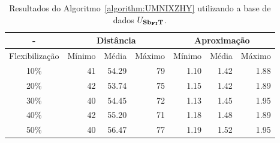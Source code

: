 \begin{table}[!htb]
  \caption{Resultados do Algoritmo~\ref{algorithm:UMNIXZHY} utilizando a base de dados $U_{\textbf{Sb\textsubscript{FI}T}}{}$.}
  \label{table:ZQDEMKFX}
  \centering
  \begin{tabular}{|c|r|r|r|r|r|r|}
    \hline
      -            & \multicolumn{3}{c|}{Distância}             & \multicolumn{3}{c|}{Aproximação}           \\ \hline
    Flexibilização & Mínimo       & Média        & Máximo       & Mínimo       & Média        & Máximo       \\ \hline  
    10\%           & 41           & 54.29        & 79           & 1.10         & 1.42         & 1.88         \\ \hline
    20\%           & 42           & 53.74        & 75           & 1.15         & 1.42         & 1.89         \\ \hline
    30\%           & 40           & 54.45        & 72           & 1.13         & 1.45         & 1.95         \\ \hline
    40\%           & 42           & 55.20        & 71           & 1.18         & 1.48         & 1.89         \\ \hline
    50\%           & 40           & 56.47        & 77           & 1.19         & 1.52         & 1.95         \\ \hline    
  \end{tabular}
\end{table}